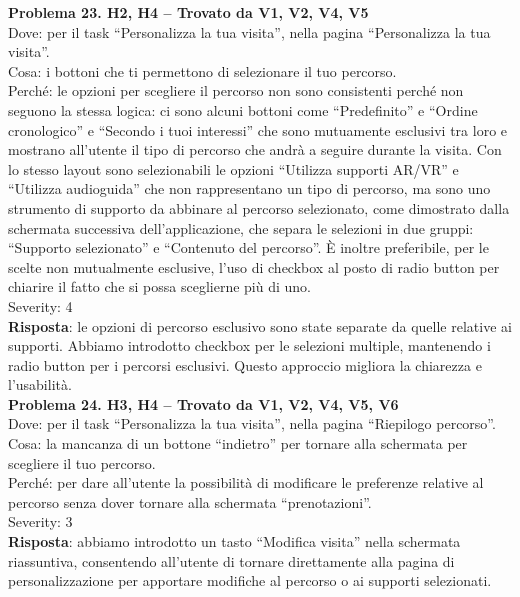\documentclass{article}
\begin{document}
\noindent \textbf{Problema 23. H2, H4 – Trovato da V1, V2, V4, V5} \\
Dove: per il task “Personalizza la tua visita”, nella pagina “Personalizza la tua visita”. \\
Cosa: i bottoni che ti permettono di selezionare il tuo percorso. \\
Perché: le opzioni per scegliere il percorso non sono consistenti perché non seguono la stessa logica: ci sono alcuni bottoni come “Predefinito” e “Ordine cronologico” e “Secondo i tuoi interessi” che sono mutuamente esclusivi tra loro e mostrano all’utente il tipo di percorso che andrà a seguire durante la visita. Con lo stesso layout sono selezionabili le opzioni “Utilizza supporti AR/VR” e “Utilizza audioguida” che non rappresentano un tipo di percorso, ma sono uno strumento di supporto da abbinare al percorso selezionato, come dimostrato dalla schermata successiva dell’applicazione, che separa le selezioni in due gruppi: “Supporto selezionato” e “Contenuto del percorso”. È inoltre preferibile, per le scelte non mutualmente esclusive, l’uso di checkbox al posto di radio button per chiarire il fatto che si possa sceglierne più di uno. \\
Severity: 4 \\
\textbf{Risposta}: le opzioni di percorso esclusivo sono state separate da quelle relative ai supporti. Abbiamo introdotto checkbox per le selezioni multiple, mantenendo i radio button per i percorsi esclusivi. Questo approccio migliora la chiarezza e l’usabilità.\\

\noindent \textbf{Problema 24. H3, H4 – Trovato da V1, V2, V4, V5, V6} \\
Dove: per il task “Personalizza la tua visita”, nella pagina “Riepilogo percorso”. \\
Cosa: la mancanza di un bottone “indietro” per tornare alla schermata per scegliere il tuo percorso. \\
Perché: per dare all’utente la possibilità di modificare le preferenze relative al percorso senza dover tornare alla schermata “prenotazioni”. \\
Severity: 3 \\
\textbf{Risposta}: abbiamo introdotto un tasto “Modifica visita” nella schermata riassuntiva, consentendo all’utente di tornare direttamente alla pagina di personalizzazione per apportare modifiche al percorso o ai supporti selezionati.\\
\end{document}
